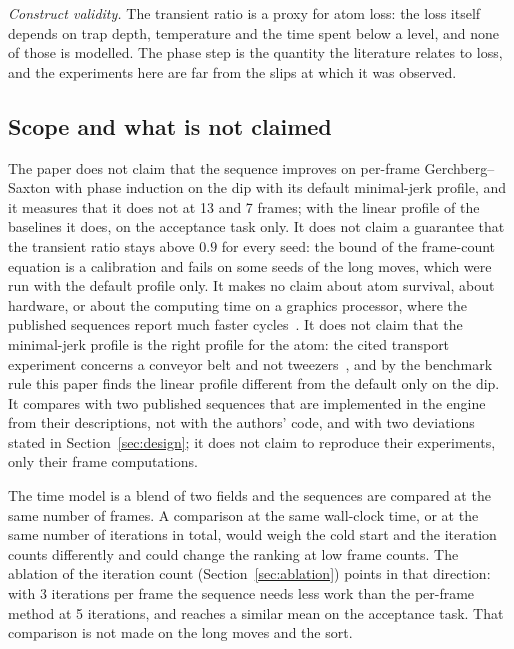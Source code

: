 \emph{Construct validity.} The transient ratio is a proxy for atom loss: the loss itself depends on trap depth, temperature and the time spent below a level, and none of those is modelled. The phase step is the quantity the literature relates to loss, and the experiments here are far from the slips at which it was observed.

\subsection{Scope and what is not claimed}

The paper does not claim that the sequence improves on per-frame Gerchberg--Saxton with phase induction on the dip with its default minimal-jerk profile, and it measures that it does not at 13 and 7 frames; with the linear profile of the baselines it does, on the acceptance task only. It does not claim a guarantee that the transient ratio stays above $0.9$ for every seed: the bound of the frame-count equation is a calibration and fails on some seeds of the long moves, which were run with the default profile only. It makes no claim about atom survival, about hardware, or about the computing time on a graphics processor, where the published sequences report much faster cycles~\cite{lpi}. It does not claim that the minimal-jerk profile is the right profile for the atom: the cited transport experiment concerns a conveyor belt and not tweezers~\cite{matthies}, and by the benchmark rule this paper finds the linear profile different from the default only on the dip. It compares with two published sequences that are implemented in the engine from their descriptions, not with the authors' code, and with two deviations stated in Section~\ref{sec:design}; it does not claim to reproduce their experiments, only their frame computations.

The time model is a blend of two fields and the sequences are compared at the same number of frames. A comparison at the same wall-clock time, or at the same number of iterations in total, would weigh the cold start and the iteration counts differently and could change the ranking at low frame counts. The ablation of the iteration count (Section~\ref{sec:ablation}) points in that direction: with 3 iterations per frame the sequence needs less work than the per-frame method at 5 iterations, and reaches a similar mean on the acceptance task. That comparison is not made on the long moves and the sort.

